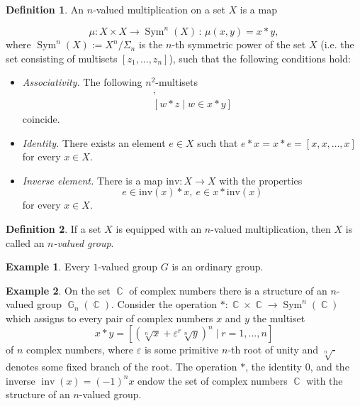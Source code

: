 \documentclass[14pt, dvipsnames]{extarticle}
\theoremstyle{plain}
\theoremstyle{definition}
\newtheorem{defi}{Definition}
\newtheorem{example}{\bf Example}
\theoremstyle{remark}
\DeclareMathOperator{\G}{\mathbb{G}}
\DeclareMathOperator{\Sym}{\mathrm{Sym}}
\DeclareMathOperator{\inv}{\mathrm{inv}}
\DeclareMathOperator{\Cc}{\mathbb{C}}
\renewcommand{\epsilon}{\varepsilon}
\begin{document}
\begin{defi}\label{nval_group_def}
An $n$-valued multiplication on a set $X$ is a map

$$\mu: X\times X \to \Sym^n(X)\,:\,\mu(x,y)=x*y,$$ where $\Sym^n(X):=X^n/\Sigma_n$ is the $n$-th symmetric power of the set $X$ (i.e. the set consisting of multisets $[z_1, ..., z_n]$), such that the following conditions hold:

\begin{itemize}

\item {\it Associativity.} The following $n^2$-multisets
\begin{gather*}
[x*w\mid w\in y \ast z],\\
[w\ast z\mid w\in x*y]
\end{gather*} 
coincide.

\item {\it Identity.} There exists an element $e\in X$ such that $e*x=x*e=[x,x,\dots,x]$\; for every\; $x\in X$.

\item {\it Inverse element.} There is a map $\mathrm{inv}\colon X\to X$ with the properties
$$e\in \mathrm{inv}(x)* x,\ e \in x*\mathrm{inv}(x)$$ for every $x\in X$.
\end{itemize}
\end{defi}

\begin{defi}
If a set $X$ is equipped with an $n$-valued multiplication, then $X$ is called an {\it $n$-valued group}.
\end{defi}

\begin{example}
Every $1$-valued group $G$ is an ordinary group.   
\end{example}

\begin{example}\label{G_n_defi}
On the set $\Cc$ of complex numbers there is a structure of an $n$-valued group $\G_n(\Cc)$. Consider the operation $\ast: \Cc\times\Cc\to \Sym^n(\Cc)$ which assigns to every pair of complex numbers $x$ and $y$ the multiset
\begin{equation}\label{operation2}
x\ast y = [(\sqrt[n]{x} + \epsilon^r\sqrt[n]{y})^n\mid r = 1, ..., n]
\end{equation}
of $n$ complex numbers, where $\epsilon$ is some primitive $n$-th root of unity and $\sqrt[n]{\cdot}$ denotes some fixed branch of the root. The operation $\ast$, the identity $0$, and the inverse $\inv(x) = (-1)^nx$ endow the set of complex numbers $\Cc$ with the structure of an $n$-valued group.
\end{example}
\end{document}
